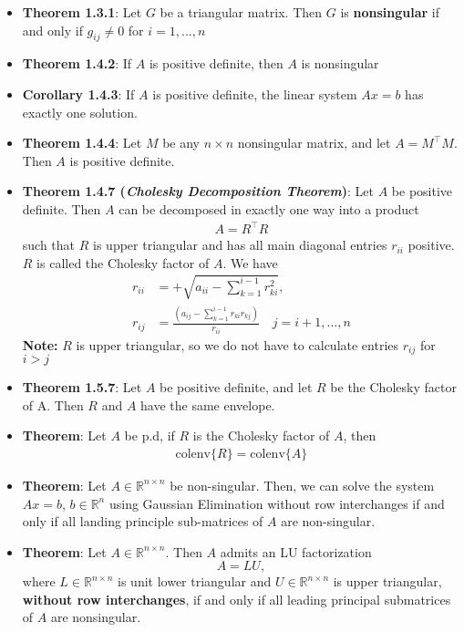 \documentclass{report}
\begin{document}
\begin{itemize}
\begin{enumerate}[(a)]
            \end{enumerate}
        \item \textbf{Theorem 1.3.1}: Let $G$ be a triangular matrix. Then $G$ is \textbf{nonsingular} if and only if
            $g_{ij} \ne 0$ for $i=1,...,n $
        \item \textbf{Theorem 1.4.2}: If $A$ is positive definite, then $A$ is nonsingular
        \item \textbf{Corollary 1.4.3}: If $A$ is positive definite, the linear system $Ax = b$ has exactly one solution.
        \item \textbf{Theorem 1.4.4}: Let $M$ be any $n \times n$ nonsingular matrix, and let $A = M^{\top}M$. Then $A$ is positive definite.
        \item \textbf{Theorem 1.4.7 (\textit{Cholesky Decomposition Theorem})}: Let $A$ be positive definite. Then $A$ can be decomposed in exactly one way into a product
            \begin{align*}
                A = R^{\top}R
            \end{align*}
            such that $R$ is upper triangular and has all main diagonal entries $r_{ii}$ positive. $R$ is called the Cholesky factor of $A$.
            \bigbreak \noindent 
            We have
            \begin{align*}
                r_{ii} &= +\sqrt{a_{ii} - \sum_{k=1}^{i-1}r_{ki}^{2}}, \\
                r_{ij} &= \frac{\left(a_{ij} - \sum_{k=1}^{i-1}r_{ki}r_{kj}\right)}{r_{ii}} \quad j=i+1,...,n
            \end{align*}
            \textbf{Note:} $R$ is upper triangular, so we do not have to calculate entries $r_{ij}$ for $i > j $
        \item \textbf{Theorem 1.5.7}: Let $A$ be positive definite, and let $R$ be the Cholesky factor of A. Then $R$ and $A$ have the same envelope.
        \item \textbf{Theorem}: Let $A$ be p.d, if $R$ is the Cholesky factor of $A$, then
            \begin{align*}
                \text{colenv}\{R\}  = \text{colenv}\{A\}
            \end{align*}
    \item \textbf{Theorem}: Let $A \in \mathbb{R}^{n\times n}$ be non-singular. Then, we can solve the system $Ax = b$, $b \in \mathbb{R}^{n}$ using Gaussian Elimination without row interchanges if and only if all landing principle sub-matrices of $A$ are non-singular.
    \item \textbf{Theorem}: Let $A \in \mathbb{R}^{n \times n}$. Then $A$ admits an LU factorization
            \[
                A = LU,
            \]
            where $L \in \mathbb{R}^{n \times n}$ is unit lower triangular and 
            $U \in \mathbb{R}^{n \times n}$ is upper triangular, 
            \textbf{without row interchanges}, if and only if all leading principal 
            submatrices of $A$ are nonsingular.


    \end{itemize}
\end{document}
